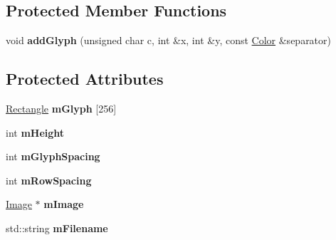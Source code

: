 \subsection*{Protected Member Functions}
\begin{DoxyCompactItemize}
\item 
void {\bfseries add\+Glyph} (unsigned char c, int \&x, int \&y, const \hyperlink{classgcn_1_1Color}{Color} \&separator)\hypertarget{classgcn_1_1ImageFont_a05f3206435b4b746206ba5f8dc6748ca}{}\label{classgcn_1_1ImageFont_a05f3206435b4b746206ba5f8dc6748ca}

\end{DoxyCompactItemize}
\subsection*{Protected Attributes}
\begin{DoxyCompactItemize}
\item 
\hyperlink{classgcn_1_1Rectangle}{Rectangle} {\bfseries m\+Glyph} \mbox{[}256\mbox{]}\hypertarget{classgcn_1_1ImageFont_abba14f56fa98e464b7a839e432d3c02b}{}\label{classgcn_1_1ImageFont_abba14f56fa98e464b7a839e432d3c02b}

\item 
int {\bfseries m\+Height}\hypertarget{classgcn_1_1ImageFont_ad3d7d7cf93af238d8937b23034061e61}{}\label{classgcn_1_1ImageFont_ad3d7d7cf93af238d8937b23034061e61}

\item 
int {\bfseries m\+Glyph\+Spacing}\hypertarget{classgcn_1_1ImageFont_afb4b350fd417e7dba6ce8f8c14a3b105}{}\label{classgcn_1_1ImageFont_afb4b350fd417e7dba6ce8f8c14a3b105}

\item 
int {\bfseries m\+Row\+Spacing}\hypertarget{classgcn_1_1ImageFont_ab0a6729c8ff035e2755a3215cadfec74}{}\label{classgcn_1_1ImageFont_ab0a6729c8ff035e2755a3215cadfec74}

\item 
\hyperlink{classgcn_1_1Image}{Image} $\ast$ {\bfseries m\+Image}\hypertarget{classgcn_1_1ImageFont_a13409336f029a03e4a5ffe7634854ce3}{}\label{classgcn_1_1ImageFont_a13409336f029a03e4a5ffe7634854ce3}

\item 
std\+::string {\bfseries m\+Filename}\hypertarget{classgcn_1_1ImageFont_ac5ed59920e10fe0d137e365baaf7c568}{}\label{classgcn_1_1ImageFont_ac5ed59920e10fe0d137e365baaf7c568}

\end{DoxyCompactItemize}


